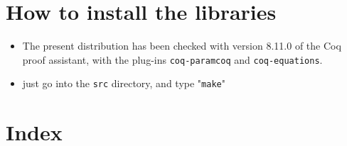 \documentclass{book}
\begin{document}
\section{How to install the libraries}
\label{sec:orgheadline4}
\begin{itemize}
\item The present distribution has been checked with version 8.11.0 of the Coq proof assistant, with the plug-ins \texttt{coq-paramcoq} and \texttt{coq-equations}.

\item just go into the \texttt{src} directory, and type "\texttt{make}"
\end{itemize}


\section{Index}
\printindex



\end{document}
